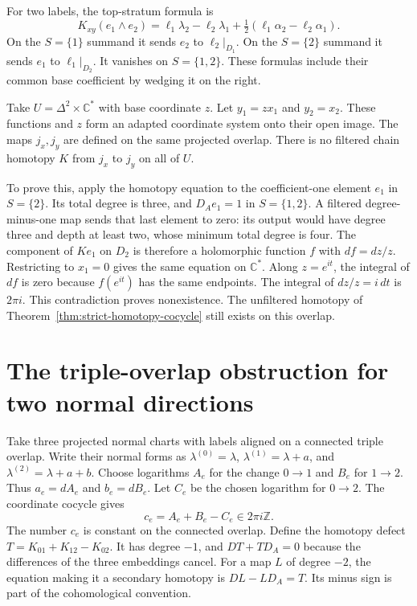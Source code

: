 For two labels, the top-stratum formula is
\begin{equation}
\label{eq:two-log-homotopy}
K_{xy}(e_1\wedge e_2)
=\ell_1\lambda_2-\ell_2\lambda_1
+\tfrac12(\ell_1\alpha_2-\ell_2\alpha_1).
\end{equation}
On the $S=\{1\}$ summand it sends $e_2$ to $\ell_2|_{D_1}$.
On the $S=\{2\}$ summand it sends $e_1$ to $\ell_1|_{D_2}$.
It vanishes on $S=\{1,2\}$.
These formulas include their common base coefficient by wedging it on the right.

\begin{example}
\label{ex:period-obstruction}
Take $U=\Delta^2\times\mathbb C^*$ with base coordinate $z$.
Let $y_1=zx_1$ and $y_2=x_2$.
These functions and $z$ form an adapted coordinate system onto their open image.
The maps $j_x,j_y$ are defined on the same projected overlap.
There is no filtered chain homotopy $K$ from $j_x$ to $j_y$ on all of $U$.

To prove this, apply the homotopy equation to the coefficient-one element $e_1$ in $S=\{2\}$.
Its total degree is three, and $D_Ae_1=1$ in $S=\{1,2\}$.
A filtered degree-minus-one map sends that last element to zero:
its output would have degree three and depth at least two, whose minimum total degree is four.
The component of $Ke_1$ on $D_2$ is therefore a holomorphic function $f$ with
$df=dz/z$.
Restricting to $x_1=0$ gives the same equation on $\mathbb C^*$.
Along $z=e^{it}$, the integral of $df$ is zero because $f(e^{it})$ has the same endpoints.
The integral of $dz/z=i\,dt$ is $2\pi i$.
This contradiction proves nonexistence.
The unfiltered homotopy of Theorem~\ref{thm:strict-homotopy-cocycle} still exists on this overlap.
\end{example}

\section{The triple-overlap obstruction for two normal directions}
\label{sec:triple-obstruction}

Take three projected normal charts with labels aligned on a connected triple overlap.
Write their normal forms as
$\lambda^{(0)}=\lambda$,
$\lambda^{(1)}=\lambda+a$,
and $\lambda^{(2)}=\lambda+a+b$.
Choose logarithms $A_e$ for the change $0\to1$ and $B_e$ for $1\to2$.
Thus $a_e=dA_e$ and $b_e=dB_e$.
Let $C_e$ be the chosen logarithm for $0\to2$.
The coordinate cocycle gives
\begin{equation}
\label{eq:logarithm-obstruction}
c_e=A_e+B_e-C_e\in2\pi i\mathbb Z.
\end{equation}
The number $c_e$ is constant on the connected overlap.
Define the homotopy defect
$T=K_{01}+K_{12}-K_{02}$.
It has degree $-1$, and $DT+TD_A=0$ because the differences of the three embeddings cancel.
For a map $L$ of degree $-2$, the equation making it a secondary homotopy is
$DL-LD_A=T$.
Its minus sign is part of the cohomological convention.

